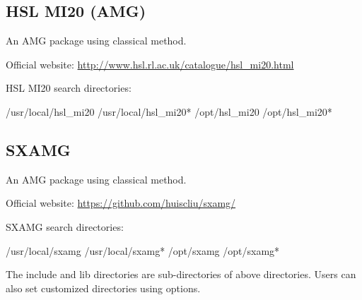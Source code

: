 \subsection{HSL MI20 (AMG)}
An AMG package using classical method. 

Official website: \url{http://www.hsl.rl.ac.uk/catalogue/hsl_mi20.html}

HSL MI20 search directories:
\begin{evb}
/usr/local/hsl_mi20
/usr/local/hsl_mi20*
/opt/hsl_mi20
/opt/hsl_mi20*
\end{evb}

\subsection{SXAMG}
An AMG package using classical method. 

Official website: \url{https://github.com/huiscliu/sxamg/}

SXAMG search directories:
\begin{evb}
/usr/local/sxamg
/usr/local/sxamg*
/opt/sxamg
/opt/sxamg*
\end{evb}

The include and lib directories are sub-directories of above directories. Users can also set customized directories using options.

